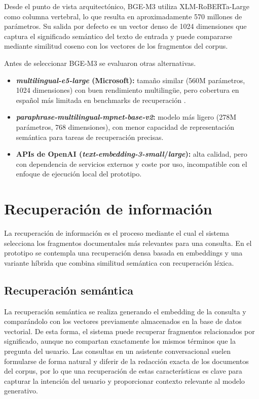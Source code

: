 Desde el punto de vista arquitectónico, BGE-M3 utiliza XLM-RoBERTa-Large como columna vertebral, lo que resulta en aproximadamente 570 millones de parámetros.
Su salida por defecto es un vector denso de 1024 dimensiones que captura el significado semántico del texto de entrada y puede compararse mediante similitud coseno con los vectores de los fragmentos del corpus.

Antes de seleccionar BGE-M3 se evaluaron otras alternativas.

\begin{itemize}
    \item \textbf{\textit{multilingual-e5-large} (Microsoft):} tamaño similar (560M parámetros, 1024 dimensiones) con buen rendimiento multilingüe, pero cobertura en español más limitada en benchmarks de recuperación \cite{wang2024multilingual}.
    \item \textbf{\textit{paraphrase-multilingual-mpnet-base-v2}:} modelo más ligero (278M parámetros, 768 dimensiones), con menor capacidad de representación semántica para tareas de recuperación precisas.
    \item \textbf{APIs de OpenAI (\textit{text-embedding-3-small}/\textit{large}):} alta calidad, pero con dependencia de servicios externos y coste por uso, incompatible con el enfoque de ejecución local del prototipo.
\end{itemize}


\section{Recuperación de información}\label{sec:recuperacion-informacion}

La recuperación de información es el proceso mediante el cual el sistema selecciona los fragmentos documentales más relevantes para una consulta. 
En el prototipo se contempla una recuperación densa basada en embeddings y una variante híbrida que combina similitud semántica con recuperación léxica.

\subsection{Recuperación semántica}\label{subsec:recuperacion-semantica}

La recuperación semántica se realiza generando el embedding de la consulta y comparándolo con los vectores previamente almacenados en la base de datos vectorial. 
De esta forma, el sistema puede recuperar fragmentos relacionados por significado, aunque no compartan exactamente los mismos términos que la pregunta del usuario.
Las consultas en un asistente conversacional suelen formularse de forma natural y diferir de la redacción exacta de los documentos del corpus, por lo que una recuperación de estas características es clave para capturar la intención del usuario y proporcionar contexto relevante al modelo generativo.

